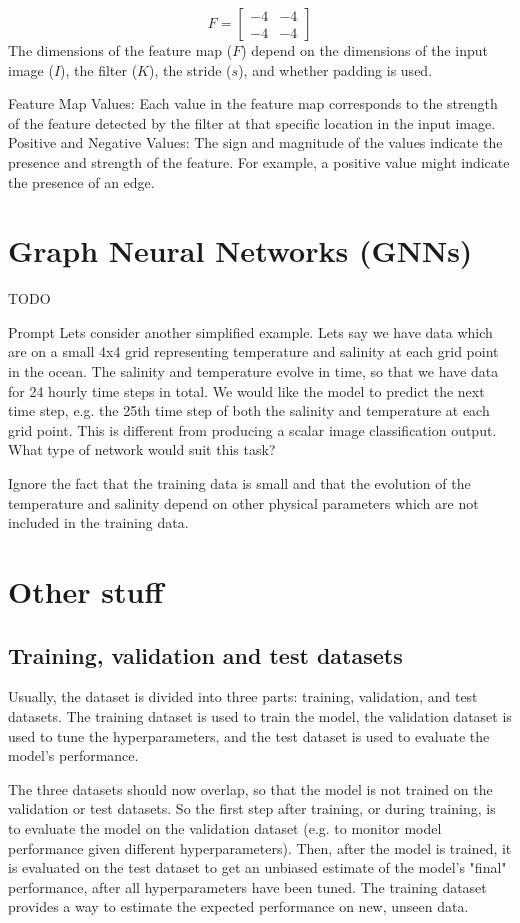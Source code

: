 \documentclass{article}
\begin{document}
\[ F = \begin{bmatrix} -4 & -4 \\ -4 & -4 \end{bmatrix} \]
%
The dimensions of the feature map ($F$) depend on the dimensions of the input image ($I$), the filter ($K$), the stride ($s$), and whether padding is used.

Feature Map Values: Each value in the feature map corresponds to the strength of the feature detected by the filter at that specific location in the input image. Positive and Negative Values: The sign and magnitude of the values indicate the presence and strength of the feature. For example, a positive value might indicate the presence of an edge.

\section{Graph Neural Networks (GNNs)}
TODO




Prompt
Lets consider another simplified example. Lets say we have data which are on a small 4x4 grid representing temperature and salinity at each grid point in the ocean. The salinity and temperature evolve in time, so that we have data for 24 hourly time steps in total. We would like the model to predict the next time step, e.g. the 25th time step of both the salinity and temperature at each grid point. This is different from producing a scalar image classification output. What type of network would suit this task?

Ignore the fact that the training data is small and that the evolution of the temperature and salinity depend on other physical parameters which are not included in the training data. 




\section{Other stuff}
\subsection{Training, validation and test datasets}
Usually, the dataset is divided into three parts: training, validation, and test datasets. The training dataset is used to train the model, the validation dataset is used to tune the hyperparameters, and the test dataset is used to evaluate the model's performance. 

The three datasets should now overlap, so that the model is not trained on the validation or test datasets. So the first step after training, or during training, is to evaluate the model on the validation dataset (e.g. to monitor model performance given different hyperparameters). Then, after the model is trained, it is evaluated on the test dataset to get an unbiased estimate of the model's "final" performance, after all hyperparameters have been tuned. The training dataset provides a way to estimate the expected performance on new, unseen data.  
\end{document}
